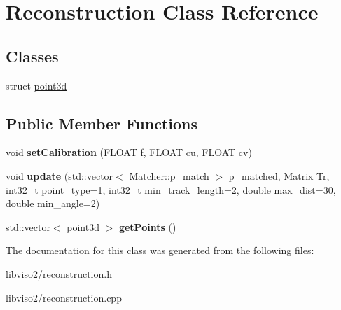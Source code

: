 \hypertarget{class_reconstruction}{\section{Reconstruction Class Reference}
\label{class_reconstruction}
}
\subsection*{Classes}
\begin{DoxyCompactItemize}
\item 
struct \hyperlink{struct_reconstruction_1_1point3d}{point3d}
\end{DoxyCompactItemize}
\subsection*{Public Member Functions}
\begin{DoxyCompactItemize}
\item 
\hypertarget{class_reconstruction_ab76af4a64c0be541da68775d033e0dc3}{void {\bfseries set\+Calibration} (F\+L\+O\+A\+T f, F\+L\+O\+A\+T cu, F\+L\+O\+A\+T cv)}\label{class_reconstruction_ab76af4a64c0be541da68775d033e0dc3}

\item 
\hypertarget{class_reconstruction_a206232fe226bcea650239aa42369e557}{void {\bfseries update} (std\+::vector$<$ \hyperlink{struct_matcher_1_1p__match}{Matcher\+::p\+\_\+match} $>$ p\+\_\+matched, \hyperlink{class_matrix}{Matrix} Tr, int32\+\_\+t point\+\_\+type=1, int32\+\_\+t min\+\_\+track\+\_\+length=2, double max\+\_\+dist=30, double min\+\_\+angle=2)}\label{class_reconstruction_a206232fe226bcea650239aa42369e557}

\item 
\hypertarget{class_reconstruction_a32a376c7c0a79628a15ed9184edc4a3e}{std\+::vector$<$ \hyperlink{struct_reconstruction_1_1point3d}{point3d} $>$ {\bfseries get\+Points} ()}\label{class_reconstruction_a32a376c7c0a79628a15ed9184edc4a3e}

\end{DoxyCompactItemize}


The documentation for this class was generated from the following files\+:\begin{DoxyCompactItemize}
\item 
libviso2/reconstruction.\+h\item 
libviso2/reconstruction.\+cpp\end{DoxyCompactItemize}
